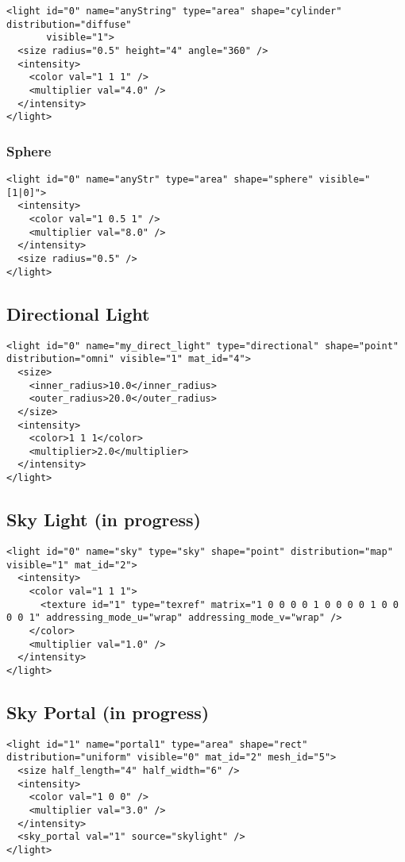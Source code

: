 \documentclass[a4paper,11pt]{report}
\begin{document}
\lstset{language=XML}
\begin{lstlisting}
<light id="0" name="anyString" type="area" shape="cylinder" distribution="diffuse" 
       visible="1">
  <size radius="0.5" height="4" angle="360" />
  <intensity>
    <color val="1 1 1" />
    <multiplier val="4.0" />
  </intensity>
</light>
\end{lstlisting}

\subsubsection{Sphere}

\lstset{language=XML}
\begin{lstlisting}
<light id="0" name="anyStr" type="area" shape="sphere" visible="[1|0]">
  <intensity>
    <color val="1 0.5 1" />
    <multiplier val="8.0" />
  </intensity>
  <size radius="0.5" />
</light>
\end{lstlisting}

\subsection{Directional Light}
\lstset{language=XML}
\begin{lstlisting}
<light id="0" name="my_direct_light" type="directional" shape="point" distribution="omni" visible="1" mat_id="4">
  <size>
    <inner_radius>10.0</inner_radius>
    <outer_radius>20.0</outer_radius>
  </size>
  <intensity>
    <color>1 1 1</color>
    <multiplier>2.0</multiplier>
  </intensity>
</light>
\end{lstlisting}

\subsection{Sky Light (in progress)}
\lstset{language=XML}
\begin{lstlisting}
<light id="0" name="sky" type="sky" shape="point" distribution="map" visible="1" mat_id="2">
  <intensity>
    <color val="1 1 1">
      <texture id="1" type="texref" matrix="1 0 0 0 0 1 0 0 0 0 1 0 0 0 0 1" addressing_mode_u="wrap" addressing_mode_v="wrap" />
    </color>
    <multiplier val="1.0" />
  </intensity>
</light>
\end{lstlisting}


\subsection{Sky Portal (in progress)}
\lstset{language=XML}
\begin{lstlisting}
<light id="1" name="portal1" type="area" shape="rect" distribution="uniform" visible="0" mat_id="2" mesh_id="5">
  <size half_length="4" half_width="6" />
  <intensity>
    <color val="1 0 0" />
    <multiplier val="3.0" />
  </intensity>
  <sky_portal val="1" source="skylight" />
</light>
\end{lstlisting}
\end{document}

